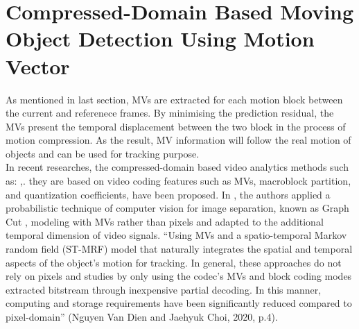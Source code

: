 \section{Compressed-Domain Based Moving Object Detection Using Motion Vector}




 As mentioned in last section, MVs are extracted for each motion block between the current and referenece frames. By minimising the prediction residual, the MVs present the temporal displacement between the two block in the process of motion compression. As the result, MV information will follow the real motion of objects and can be used for tracking purpose.\\
In recent researches, the compressed-domain based video analytics methods such as: \cite{bombardelli2018efficient},\cite{khatoonabadi2012video}. they are based on video coding features such as MVs, macroblock partition, and quantization coefficients, have been proposed. In \cite{bombardelli2018efficient}, the authors applied a probabilistic technique of computer vision for image separation, known as Graph Cut \cite{boykov2001fast}, modeling with MVs rather than pixels and adapted to the additional temporal dimension of video signals. “Using MVs and a spatio-temporal Markov random field (ST-MRF) model that naturally integrates the spatial and temporal aspects of the object’s motion for tracking. In general, these approaches do not rely on pixels and studies by only using the codec’s MVs and block coding modes extracted bitstream through inexpensive partial decoding. In this manner, computing and storage requirements have been significantly reduced compared to pixel-domain” (Nguyen Van Dien and Jaehyuk Choi, 2020, p.4).\\

